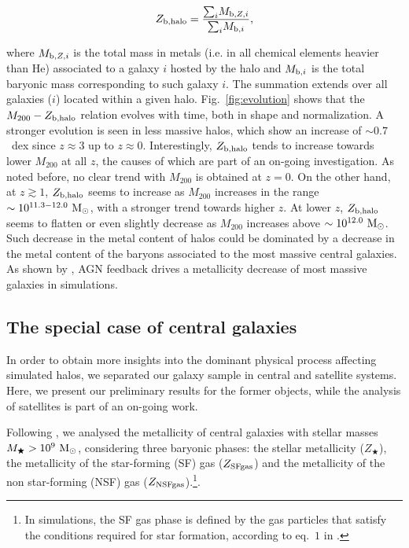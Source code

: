 \documentclass[baaa]{baaa}
\begin{document}
\begin{equation}
Z_{\rm b,halo} = \frac{{\sum}_{i} M_{{\rm b},Z,i}}{{\sum}_{i} M_{{\rm b},i}},  
\end{equation}


\noindent
where $M_{{\rm b},Z,i}$ is the total mass in metals (i.e. in all chemical elements heavier than He) associated to a galaxy $i$ hosted by the halo and $M_{{\rm b},i}$ is the total baryonic mass corresponding to such galaxy $i$. The summation extends over all galaxies ($i$) located within a given halo.
Fig.~\ref{fig:evolution} shows that the $M_{200} - Z_{\rm b,halo}$ relation evolves with time, both in shape and normalization.
A stronger evolution is seen in less massive halos, which show an increase of $\sim 0.7$~dex since $z\approx3$ up to $z\approx0$.
Interestingly, $Z_{\rm b,halo}$ tends to increase towards lower $M_{200}$ at all $z$, the causes of which are part of an on-going investigation.
As noted before, no clear trend with $M_{200}$ is obtained at $z=0$. On the other hand, at $z\gtrsim1$, $Z_{\rm b,halo}$ seems to increase as $M_{200}$ increases in the range $\sim 10^{11.3-12.0}~{\rm M}_{\odot}$, with a stronger trend towards higher $z$.
At lower $z$, $Z_{\rm b,halo}$ seems to flatten or even slightly decrease as $M_{200}$ increases above $\sim 10^{12.0}~{\rm M}_{\odot}$. Such decrease in the metal content of halos could be dominated by a decrease in the metal content of the baryons associated to the most massive central galaxies. As shown by \citet{derossi2017}, AGN feedback drives a metallicity decrease of most massive galaxies in {} simulations. 






\subsection{The special case of central galaxies}
In order to obtain more insights into the dominant physical process affecting simulated halos, we separated our galaxy sample in central and satellite systems. Here, we present our preliminary results for the former objects, while the analysis of satellites is part of an on-going work.

Following \citet{derossi2017}, we analysed the metallicity of central galaxies with stellar masses $M_{\bigstar} > 10^9~{\rm M}_{\odot}$, considering three baryonic phases: the stellar metallicity ($Z_{\bigstar}$), the metallicity of the star-forming (SF) gas ($Z_{\rm SFgas}$) and the metallicity of the non star-forming (NSF) gas ($Z_{\rm NSFgas}$).\footnote{In {} simulations, the SF gas phase is defined by the gas particles that satisfy the conditions required for star formation, according to eq.~$1$ in \citet{schaye2015}.}.
\end{document}
